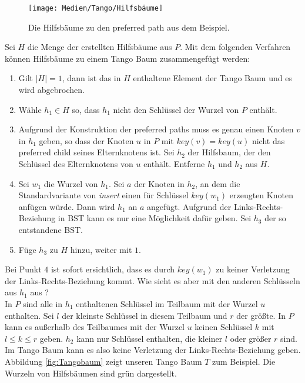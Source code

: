 \documentclass[a4paper,12pt]{article}
\begin{document}
\begin{figure}[H]
	\centering
	\texttt{[image: Medien/Tango/Hilfsbäume]}
	\caption{Die Hilfsbäume zu den preferred path aus dem Beispiel. }
	\label{fig:Hilfsbäume}
\end{figure}
\noindent Sei $H$ die Menge der erstellten Hilfsbäume aus $P$. Mit dem folgenden Verfahren können Hilfsbäume zu einem Tango Baum zusammengefügt werden:
\begin{enumerate}
	\item Gilt $\vert H \vert = 1$, dann ist das in $H$ enthaltene Element der Tango Baum und es wird abgebrochen.
	\item Wähle $h_1 \in H$ so, dass $h_1$ nicht den Schlüssel der Wurzel von $P$ enthält.
	\item Aufgrund der Konstruktion der preferred paths muss es genau einen Knoten $v$ in $h_1$ geben, so dass der Knoten $u$ in $P$ mit $\mathit{key}\left(v\right) = \mathit{key}\left(u\right) $ nicht das preferred child seines Elternknotens ist.
	Sei $h_2$ der Hilfsbaum, der den Schlüssel des Elternknotens von $u$ enthält. Entferne $h_1$ und $h_2$ aus $H$.
	\item Sei $w_1$ die Wurzel von $h_1$. Sei $a$ der Knoten in $h_2$, an dem die Standardvariante von \textit{insert} einen für Schlüssel  $\mathit{key\left(w_1\right)}$ erzeugten Knoten anfügen würde. Dann wird $h_1$ an $a$ angefügt. Aufgrund der Links-Rechts-Beziehung in BST kann es nur eine Möglichkeit dafür geben. Sei $h_3$ der so entstandene BST.
	\item Füge $h_3$ zu $H$ hinzu, weiter mit $1$.
\end{enumerate}

\noindent Bei Punkt $4$ ist sofort ersichtlich, dass es durch $\mathit{key}\left(w_1\right)$ zu keiner Verletzung der Links-Rechts-Beziehung kommt. Wie sieht es aber mit den anderen Schlüsseln aus $h_1$ aus ? \\
In $P$ sind alle in $h_1$ enthaltenen Schlüssel im Teilbaum mit der Wurzel $u$ enthalten. Sei $l$ der kleinste Schlüssel in diesem Teilbaum und $r$ der größte. In $P$ kann es außerhalb des Teilbaumes mit der Wurzel $u$ keinen Schlüssel $k$ mit $l \leq k \leq r$ geben. $h_2$ kann nur Schlüssel enthalten, die kleiner $l$ oder größer $r$ sind. Im Tango Baum kann es also keine Verletzung der Links-Rechts-Beziehung geben.\\


\noindent Abbildung \ref{fig:Tangobaum} zeigt unseren Tango Baum $T$ zum Beispiel. Die Wurzeln von Hilfsbäumen sind grün dargestellt.
\end{document}
